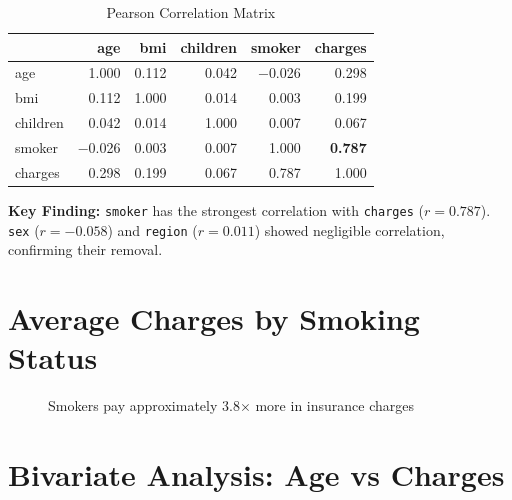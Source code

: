 \documentclass[12pt,a4paper]{report}
\begin{document}
\begin{table}[H]
\centering
\caption{Pearson Correlation Matrix}
\begin{tabular}{lrrrrr}
\toprule
 & \textbf{age} & \textbf{bmi} & \textbf{children} & \textbf{smoker} & \textbf{charges} \\
\midrule
age      & 1.000    & 0.112 & 0.042 & $-$0.026 & 0.298 \\
bmi      & 0.112    & 1.000 & 0.014 &    0.003 & 0.199 \\
children & 0.042    & 0.014 & 1.000 &    0.007 & 0.067 \\
smoker   & $-$0.026 & 0.003 & 0.007 &    1.000 & \textbf{0.787} \\
charges  & 0.298    & 0.199 & 0.067 &    0.787 & 1.000 \\
\bottomrule
\end{tabular}
\end{table}

\begin{infobox}
\textbf{Key Finding:} \texttt{smoker} has the strongest correlation with \texttt{charges} ($r = 0.787$). \texttt{sex} ($r = -0.058$) and \texttt{region} ($r = 0.011$) showed negligible correlation, confirming their removal.
\end{infobox}

\section{Average Charges by Smoking Status}

\begin{figure}[H]
\centering
{}
\caption{Smokers pay approximately 3.8$\times$ more in insurance charges}
\end{figure}

\section{Bivariate Analysis: Age vs Charges}
\end{document}
